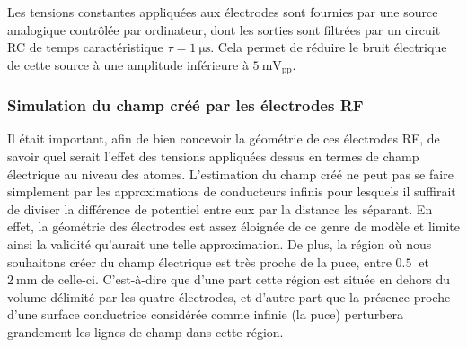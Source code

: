 Les tensions constantes appliquées aux électrodes sont fournies par une source analogique contrôlée par ordinateur, dont les sorties sont filtrées par un circuit RC de temps caractéristique $\tau=\SI{1}{\us}$.
Cela permet de réduire le bruit électrique de cette source à une amplitude inférieure à $\SI{5}{\milli\V}_{\mathrm{pp}}$.

\subsubsection*{Simulation du champ créé par les électrodes RF}
\noindent Il était important, afin de bien concevoir la géométrie de ces électrodes RF, de savoir quel serait l'effet des tensions appliquées dessus en termes de champ électrique au niveau des atomes.
L'estimation du champ créé ne peut pas se faire simplement par les approximations de conducteurs infinis pour lesquels il suffirait de diviser la différence de potentiel entre eux par la distance les séparant.
En effet, la géométrie des électrodes est assez éloignée de ce genre de modèle et limite ainsi la validité qu'aurait une telle approximation.
De plus, la région où nous souhaitons créer du champ électrique est très proche de la puce, entre $\SI{0.5}{}$ et $\SI{2}{\mm}$ de celle-ci.
C'est-à-dire que d'une part cette région est située en dehors du volume délimité par les quatre électrodes, et d'autre part que la présence proche d'une surface conductrice considérée comme infinie (la puce) perturbera grandement les lignes de champ dans cette région.

